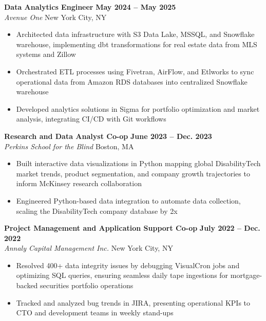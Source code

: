 \documentclass[a4paper,10.5pt]{article}
\begin{document}
\textbf{Data Analytics Engineer} \hfill \textbf{May 2024 -- May 2025} \\
\textit{Avenue One} \hfill New York City, NY \vspace{-2mm}
\begin{itemize}[noitemsep, label={$\bullet$}]
    \item Architected data infrastructure with S3 Data Lake, MSSQL, and Snowflake warehouse, implementing dbt transformations for real estate data from MLS systems and Zillow
    \item Orchestrated ETL processes using Fivetran, AirFlow, and Etlworks to sync operational data from Amazon RDS databases into centralized Snowflake warehouse
    \item Developed analytics solutions in Sigma for portfolio optimization and market analysis, integrating CI/CD with Git workflows
\end{itemize}

\textbf{Research and Data Analyst Co-op} \hfill \textbf{June 2023 -- Dec. 2023} \\
\textit{Perkins School for the Blind} \hfill Boston, MA \vspace{-2mm}
\begin{itemize}[noitemsep, label={$\bullet$}]
    \item Built interactive data visualizations in Python mapping global DisabilityTech market trends, product segmentation, and company growth trajectories to inform McKinsey research collaboration
    \item Engineered Python-based data integration to automate data collection, scaling the DisabilityTech company database by 2x
\end{itemize}

\textbf{Project Management and Application Support Co-op} \hfill \textbf{July 2022 -- Dec. 2022} \\
\textit{Annaly Capital Management Inc.} \hfill New York City, NY \vspace{-2mm}
\begin{itemize}[noitemsep, label={$\bullet$}]
    \item Resolved 400+ data integrity issues by debugging VisualCron jobs and optimizing SQL queries, ensuring seamless daily tape ingestions for mortgage-backed securities portfolio operations
    \item Tracked and analyzed bug trends in JIRA, presenting operational KPIs to CTO and development teams in weekly stand-ups
\end{itemize}
\end{document}
